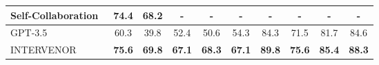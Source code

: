 \documentclass[11pt]{article}
\begin{document}
\begin{table*}[h]
\begin{tabular}{l|ccccc|cccc}
Self-Collaboration~\cite{dong2023selfcollaboration}              & \multicolumn{1}{c|}{74.4}               & \multicolumn{1}{c|}{68.2}          & -             & -             & -             & -             & -             & -             & -             \\ \hline
GPT-3.5~\cite{chatgpt}                 & \multicolumn{1}{c|}{60.3}               & \multicolumn{1}{c|}{39.8}          & 52.4          & 50.6          & 54.3          & 84.3          & 71.5          & 81.7          & 84.6          \\
INTERVENOR                      & \multicolumn{1}{c|}{\textbf{75.6}}      & \multicolumn{1}{c|}{\textbf{69.8}} & \textbf{67.1} & \textbf{68.3} & \textbf{67.1} & \textbf{89.8}          & \textbf{75.6} & \textbf{85.4} & \textbf{88.3} \\ \hline
\end{tabular}
\end{table*}
\end{document}
